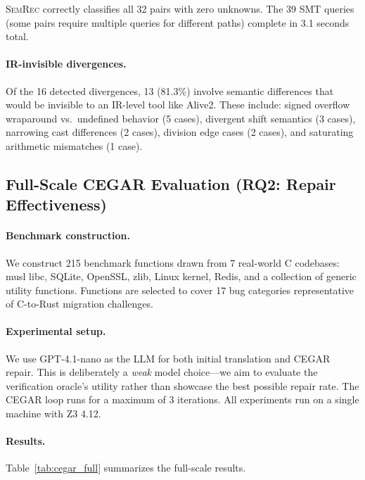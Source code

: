 \documentclass[10pt,letterpaper]{article}
\begin{document}
\textsc{SemRec} correctly classifies all 32 pairs with zero unknowns. The 39 SMT
queries (some pairs require multiple queries for different paths) complete in 3.1
seconds total.

\paragraph{IR-invisible divergences.}
Of the 16 detected divergences, 13 (81.3\%) involve semantic differences that would
be invisible to an IR-level tool like Alive2. These include: signed overflow
wraparound vs.\ undefined behavior (5 cases), divergent shift semantics (3 cases),
narrowing cast differences (2 cases), division edge cases (2 cases), and saturating
arithmetic mismatches (1 case).

\subsection{Full-Scale CEGAR Evaluation (RQ2: Repair Effectiveness)}
\label{sec:fullscale}

\paragraph{Benchmark construction.}
We construct 215 benchmark functions drawn from 7 real-world C codebases:
musl libc, SQLite, OpenSSL, zlib, Linux kernel, Redis, and a collection of
generic utility functions. Functions are selected to cover 17 bug categories
representative of C-to-Rust migration challenges.

\paragraph{Experimental setup.}
We use GPT-4.1-nano as the LLM for both initial translation and CEGAR repair.
This is deliberately a \emph{weak} model choice---we aim to evaluate the
verification oracle's utility rather than showcase the best possible repair
rate. The CEGAR loop runs for a maximum of 3 iterations. All experiments
run on a single machine with Z3 4.12.

\paragraph{Results.}
Table~\ref{tab:cegar_full} summarizes the full-scale results.
\end{document}
